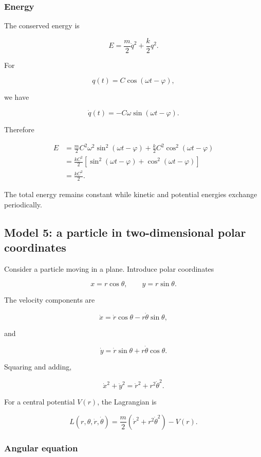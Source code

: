 \subsubsection{Energy}

The conserved energy is

\[
E
=
\frac{m}{2}\dot q^{2}
+
\frac{k}{2}q^{2}.
\]

For

\[
q(t)=C\cos(\omega t-\varphi),
\]

we have

\[
\dot q(t)
=
-C\omega\sin(\omega t-\varphi).
\]

Therefore

\[
\begin{aligned}
E
&=
\frac{m}{2}
C^{2}\omega^{2}
\sin^{2}(\omega t-\varphi)
+
\frac{k}{2}
C^{2}
\cos^{2}(\omega t-\varphi)\\
&=
\frac{kC^{2}}{2}
\left[
\sin^{2}(\omega t-\varphi)
+
\cos^{2}(\omega t-\varphi)
\right]\\
&=
\boxed{
\frac{kC^{2}}{2}
}.
\end{aligned}
\]

The total energy remains constant while kinetic and potential energies exchange periodically.

\subsection{Model 5: a particle in two-dimensional polar coordinates}

Consider a particle moving in a plane. Introduce polar coordinates

\[
x=r\cos\theta,
\qquad
y=r\sin\theta.
\]

The velocity components are

\[
\dot x
=
\dot r\cos\theta-r\dot\theta\sin\theta,
\]

and

\[
\dot y
=
\dot r\sin\theta+r\dot\theta\cos\theta.
\]

Squaring and adding,

\[
\dot x^{2}+\dot y^{2}
=
\dot r^{2}+r^{2}\dot\theta^{2}.
\]

For a central potential \(V(r)\), the Lagrangian is

\[
\boxed{
L(r,\theta,\dot r,\dot\theta)
=
\frac{m}{2}
\left(
\dot r^{2}+r^{2}\dot\theta^{2}
\right)
-
V(r)
}.
\]

\subsubsection{Angular equation}

